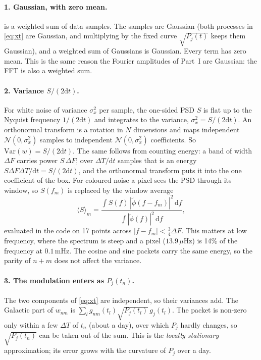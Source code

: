 \documentclass[11pt,a4paper]{article}
\newcommand{\dd}{\mathrm{d}}
\begin{document}
\paragraph{1. Gaussian, with zero mean.}  is a weighted sum of data
samples. The samples are Gaussian (both processes in \cref{eq:xt} are Gaussian, and
multiplying by the fixed curve $\sqrt{P_j(t)}$ keeps them Gaussian), and a weighted
sum of Gaussians is Gaussian. Every term has zero mean. This is the same reason the
Fourier amplitudes of Part~I are Gaussian: the FFT is also a weighted sum.

\paragraph{2. Variance $S/(2\dd t)$.} For white noise of variance $\sigma_x^2$ per
sample, the one-sided PSD $S$ is flat up to the Nyquist frequency $1/(2\dd t)$ and
integrates to the variance, $\sigma_x^2 = S/(2\dd t)$. An orthonormal transform is a
rotation in $N$ dimensions and maps independent $\mathcal N(0,\sigma_x^2)$ samples to
independent $\mathcal N(0,\sigma_x^2)$ coefficients. So $\mathrm{Var}(w)=S/(2\dd t)$.
The same follows from counting energy: a band of width $\Delta F$ carries power
$S\,\Delta F$; over $\Delta T/\dd t$ samples that is an energy $S\Delta F\Delta T/\dd t
= S/(2\dd t)$, and the orthonormal transform puts it into the one coefficient of the
box. For coloured noise a pixel sees the PSD through its window, so $S(f_m)$ is
replaced by the window average
\begin{equation}
  \langle S\rangle_m = \frac{\int S(f)\,|\tilde\phi(f-f_m)|^2\,\dd f}{\int|\tilde\phi(f)|^2\,\dd f},
\end{equation}
evaluated in the code on 17 points across $|f-f_m|<\tfrac34\Delta F$. This matters at
low frequency, where the spectrum is steep and a pixel ($13.9\,\mu$Hz) is 14\% of the
frequency at $0.1$\,mHz. The cosine and sine packets carry the same energy, so the
parity of $n+m$ does not affect the variance.

\paragraph{3. The modulation enters as $P_j(t_n)$.} The two components of
\cref{eq:xt} are independent, so their variances add. The Galactic part of $w_{nm}$
is $\sum_l g_{nm}(t_l)\sqrt{P_j(t_l)}\,g_j(t_l)$. The packet is non-zero only within a
few $\Delta T$ of $t_n$ (about a day), over which $P_j$ hardly changes, so
$\sqrt{P_j(t_n)}$ can be taken out of the sum. This is the \emph{locally stationary}
approximation; its error grows with the curvature of $P_j$ over a day.
\end{document}
